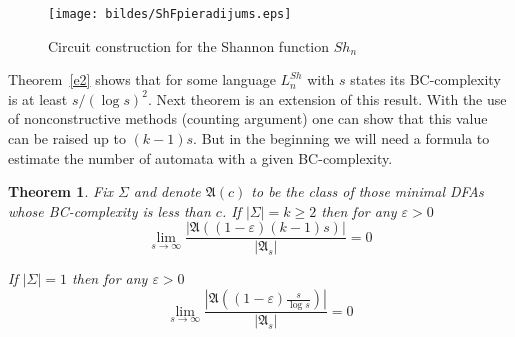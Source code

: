 \documentclass[copyright, creativecommons]{eptcs}
\newtheorem{theorem}{Theorem}[section]
\begin{document}
\begin{figure}[htb]
	\centering
		\texttt{[image: bildes/ShFpieradijums.eps]}
	\caption{Circuit construction for the Shannon function $Sh_n$}
	\label{ShFpieradijums}
\end{figure}



Theorem~\ref{e2} shows that for some language $L^{Sh}_n$ with $s$ states its BC-complexity is at least $s/(\log{s})^2$.
Next theorem is an extension of this result. With the use of nonconstructive methods (counting argument)
one can show that this value can be raised up to $(k-1)s$. But in the beginning we will need a formula to estimate
the number of automata with a given BC-complexity.

\begin{theorem}
\label{apaksRobMinim}
Fix $\Sigma$ and denote $\mathfrak{A}(c)$ to be the class of those minimal DFAs
whose BC-complexity is less than $c$. If $|\Sigma|=k\geq 2$ then for any $\varepsilon>0$ 
$$\lim_{s\to\infty}\frac{|\mathfrak{A}((1-\varepsilon)(k-1)s)|}{|\mathfrak{A}_s|}=0$$

If $|\Sigma|=1$ then for any $\varepsilon>0$
$$\lim_{s\to\infty}\frac{|\mathfrak{A}((1-\varepsilon)\frac{s}{\log{s}})|}{|\mathfrak{A}_s|}=0$$
\end{theorem}
\end{document}
